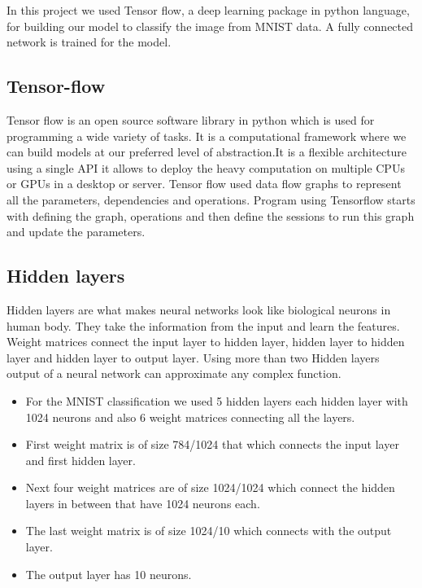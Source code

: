 In this project we used Tensor flow, a deep learning package in python
language, for building our model to classify the image from MNIST data. A
fully connected network is trained for the model.

\subsection{Tensor-flow}

Tensor flow is an open source software library in python which is used for
programming a wide variety of tasks. It is a computational framework where we
can build models at our preferred level of abstraction.It is a flexible
architecture using a single API it allows to deploy the heavy computation on
multiple CPUs or GPUs in a desktop or server. Tensor flow used data flow graphs
to represent all the parameters, dependencies and operations. Program using
Tensorflow starts with defining the graph, operations and then define the
sessions to run this graph and update the parameters. 



\subsection{Hidden layers} 

Hidden layers are what makes neural networks look like biological neurons in
human body. They take the information from the input and learn the features.
Weight matrices connect the input layer to hidden layer, hidden layer to hidden
layer and hidden layer to output layer. Using more than two Hidden layers output
of a neural network can approximate any complex function. 

\begin{itemize}

  \item For the MNIST classification we used 5 hidden layers each hidden layer
  with 1024 neurons and also 6 weight matrices connecting all the layers.

  \item First weight matrix is of size 784/1024 that which connects the input
  layer and first hidden layer.

  \item Next four weight matrices are of size 1024/1024 which connect the
  hidden layers in between that have 1024 neurons each.

  \item The last weight matrix is of size 1024/10 which connects with the
  output layer.

  \item The output layer has 10 neurons. 

\end{itemize}


